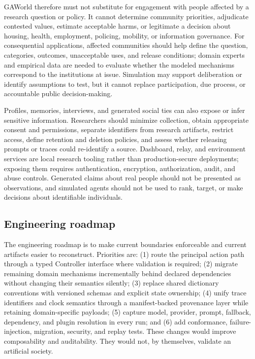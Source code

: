 GAWorld therefore must not substitute for engagement with people affected by
a research question or policy.  It cannot determine community priorities,
adjudicate contested values, estimate acceptable harms, or legitimate a
decision about housing, health, employment, policing, mobility, or information
governance.  For consequential applications, affected communities should help
define the question, categories, outcomes, unacceptable uses, and release
conditions; domain experts and empirical data are needed to evaluate whether
the modeled mechanisms correspond to the institutions at issue.  Simulation
may support deliberation or identify assumptions to test, but it cannot replace
participation, due process, or accountable public decision-making.

Profiles, memories, interviews, and generated social ties can also expose or
infer sensitive information.  Researchers should minimize collection, obtain
appropriate consent and permissions, separate identifiers from research
artifacts, restrict access, define retention and deletion policies, and assess
whether releasing prompts or traces could re-identify a source.  Dashboard,
relay, and environment services are local research tooling rather than
production-secure deployments; exposing them requires authentication,
encryption, authorization, audit, and abuse controls.  Generated claims about
real people should not be presented as observations, and simulated agents
should not be used to rank, target, or make decisions about identifiable
individuals.

\subsection{Engineering roadmap}

The engineering roadmap is to make current boundaries enforceable and current
artifacts easier to reconstruct.  Priorities are: (1) route the principal
action path through a typed Controller interface where validation is required;
(2) migrate remaining domain mechanisms incrementally behind declared
dependencies without changing their semantics silently; (3) replace shared
dictionary conventions with versioned schemas and explicit state ownership;
(4) unify trace identifiers and clock semantics through a manifest-backed
provenance layer while retaining domain-specific payloads; (5) capture model,
provider, prompt, fallback, dependency, and plugin resolution in every run;
and (6) add conformance, failure-injection, migration, security, and replay
tests.  These changes would improve composability and auditability.  They would
not, by themselves, validate an artificial society.

